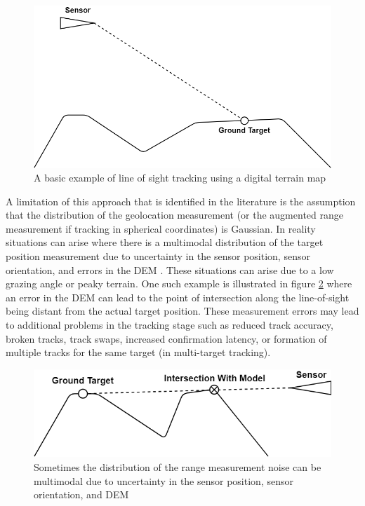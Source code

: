 \documentclass[journal]{IEEEtran}
\begin{document}
\begin{figure}[ht]
    \centering
    \includegraphics[scale=0.28]{TerrainTrackingDiagram.png}
    \caption{A basic example of line of sight tracking using a digital terrain map}
    \label{fig:lineofsightbasic}
\end{figure}

A limitation of this approach that is identified in the literature \cite{collins1989terrain, collins1998using, davison1999mobile} is the assumption that the distribution of the geolocation measurement (or the augmented range measurement if tracking in spherical coordinates) is Gaussian. In reality situations can arise where there is a multimodal distribution of the target position measurement due to uncertainty in the sensor position, sensor orientation, and errors in the DEM \cite{collins1998using, dastner2009fusion}. These situations can arise due to a low grazing angle or peaky terrain. One such example is illustrated in figure \ref{fig:lineofsightmultimodal} where an error in the DEM can lead to the point of intersection along the line-of-sight being distant from the actual target position. These measurement errors may lead to additional problems in the tracking stage such as reduced track accuracy, broken tracks, track swaps, increased confirmation latency, or formation of multiple tracks for the same target (in multi-target tracking).

\begin{figure}[ht]
    \centering
    \includegraphics[scale=0.28]{TerrainTrackingDiagramMultimodal.png}
    \caption{Sometimes the distribution of the range measurement noise can be multimodal due to uncertainty in the sensor position, sensor orientation, and DEM}
    \label{fig:lineofsightmultimodal}
\end{figure}
\end{document}
